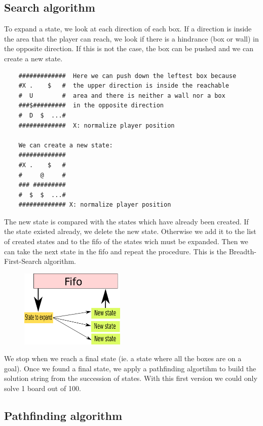 \documentclass[a4paper,10pt]{article}
\begin{document}
	
	\subsection{Search algorithm}
	To expand a state, we look at each direction of each box. 
	If a direction is inside the area that the player can reach, we look if there is a hindrance (box or wall) in the opposite direction.
	If this is not the case, the box can be pushed and we can create a new state.

	\begin{verbatim}
	#############  Here we can push down the leftest box because 
	#X .    $   #  the upper direction is inside the reachable 
	#  U        #  area and there is neither a wall nor a box
	###$#########  in the opposite direction
	#  D  $  ...#  
	#############  X: normalize player position

	We can create a new state:
	#############
	#X .    $   #
	#     @     #
	### #########
	#  $  $  ...#
	############# X: normalize player position
	\end{verbatim}

	The new state is compared with the states which have already been created. 
	If the state existed already, we delete the new state.
	Otherwise we add it to the list of created states and to the fifo of the states wich must be expanded.
	Then we can take the next state in the fifo and repeat the procedure.
	This is the Breadth-First-Search algorithm.

	\begin{figure}[h]
	\centerline{\includegraphics[height=5 cm, width=5cm]{./state_fifo.png}}
	\end{figure}

	We stop when we reach a final state (ie. a state where all the boxes are on a goal).
	Once we found a final state, we apply a pathfinding algortihm to build the solution string from the succession of states.
 With this first version we could only solve 1 board out of 100. 

	\subsection{Pathfinding algorithm}
\end{document}
